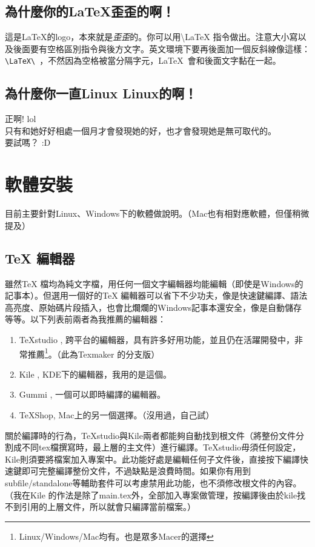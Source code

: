 \documentclass[class=NCU_thesis, crop=false, float=true]{standalone}
\begin{document}
\section{為什麼你的\LaTeX 歪歪的啊！}
這是\LaTeX 的logo，本來就是\textit{歪歪}的。你可以用\textbackslash{}LaTeX 指令做出。注意大小寫以及後面要有空格區別指令與後方文字。英文環境下要再後面加一個反斜線像這樣：\verb*|\LaTeX\ |，不然因為空格被當分隔字元，\LaTeX\ 會和後面文字黏在一起。

\section{為什麼你一直Linux Linux的啊！}
正啊! lol \\
只有和她好好相處一個月才會發現她的好，也才會發現她是無可取代的。 \\

\noindent 要試嗎？ :D



\chapter{軟體安裝}
\label{sec:c_install}
目前主要針對Linux、Windows下的軟體做說明。（Mac也有相對應軟體，但僅稍微提及）
\section{TeX 編輯器}
雖然TeX 檔均為純文字檔，用任何一個文字編輯器均能編輯（即使是Windows的記事本）。但選用一個好的TeX 編輯器可以省下不少功夫，像是快速鍵編譯、語法高亮度、原始碼片段插入，也會比爛爛的Windows記事本還安全，像是自動儲存等等。以下列表前兩者為我推薦的編輯器：
\begin{enumerate}
    \item TeXstudio , 跨平台的編輯器，具有許多好用功能，並且仍在活躍開發中，非常推薦\footnote{Linux/Windows/Mac均有。也是眾多Macer的選擇}。（此為Texmaker 的分支版）
    \item Kile , KDE下的編輯器，我用的是這個。
    \item Gummi , 一個可以即時編譯的編輯器。
    \item TeXShop, Mac上的另一個選擇。（沒用過，自己試） 
\end{enumerate}
關於編譯時的行為，TeXstudio與Kile兩者都能夠自動找到根文件（將整份文件分割成不同tex檔撰寫時，最上層的主文件）進行編譯。TeXstudio毋須任何設定，Kile則須要將檔案加入專案中。此功能好處是編輯任何子文件後，直接按下編譯快速鍵即可完整編譯整份文件，不過缺點是浪費時間。如果你有用到subfile/standalone等輔助套件可以考慮禁用此功能，也不須修改根文件的內容。（我在Kile 的作法是除了main.tex外，全部加入專案做管理，按編譯後由於kile找不到引用的上層文件，所以就會只編譯當前檔案。）
\end{document}
